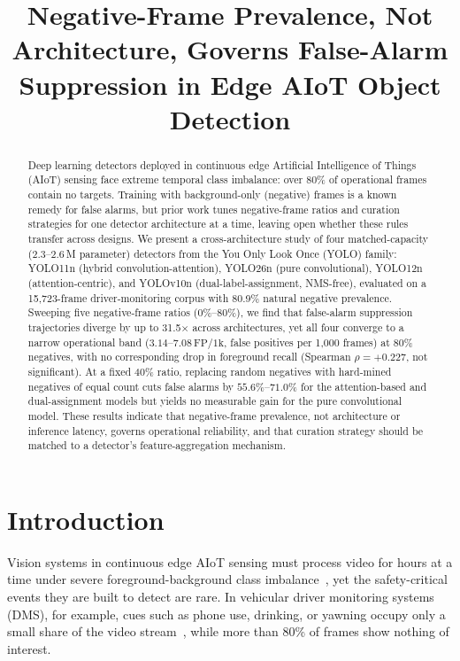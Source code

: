 \documentclass[conference]{IEEEtran}
\begin{document}
\title{Negative-Frame Prevalence, Not Architecture, Governs False-Alarm Suppression in Edge AIoT Object Detection}
\author{
}
\maketitle


\begin{abstract}
Deep learning detectors deployed in continuous edge Artificial Intelligence of Things (AIoT) sensing face extreme temporal class imbalance: over 80\% of operational frames contain no targets. Training with background-only (negative) frames is a known remedy for false alarms, but prior work tunes negative-frame ratios and curation strategies for one detector architecture at a time, leaving open whether these rules transfer across designs. We present a cross-architecture study of four matched-capacity ($2.3$--$2.6$\,M parameter) detectors from the You Only Look Once (YOLO) family: YOLO11n (hybrid convolution-attention), YOLO26n (pure convolutional), YOLO12n (attention-centric), and YOLOv10n (dual-label-assignment, NMS-free), evaluated on a 15,723-frame driver-monitoring corpus with 80.9\% natural negative prevalence. Sweeping five negative-frame ratios (0\%--80\%), we find that false-alarm suppression trajectories diverge by up to 31.5$\times$ across architectures, yet all four converge to a narrow operational band ($3.14$--$7.08\,\mathrm{FP/1k}$, false positives per 1,000 frames) at 80\% negatives, with no corresponding drop in foreground recall (Spearman $\rho = +0.227$, not significant). At a fixed 40\% ratio, replacing random negatives with hard-mined negatives of equal count cuts false alarms by $55.6\%$--$71.0\%$ for the attention-based and dual-assignment models but yields no measurable gain for the pure convolutional model. These results indicate that negative-frame prevalence, not architecture or inference latency, governs operational reliability, and that curation strategy should be matched to a detector's feature-aggregation mechanism.
\end{abstract}

\section{Introduction}
\label{sec:intro}

Vision systems in continuous edge AIoT sensing must process video for hours at a time under severe foreground-background class imbalance~\cite{b1}, yet the safety-critical events they are built to detect are rare. In vehicular driver monitoring systems (DMS), for example, cues such as phone use, drinking, or yawning occupy only a small share of the video stream~\cite{b12}, while more than 80\% of frames show nothing of interest.
\end{document}
